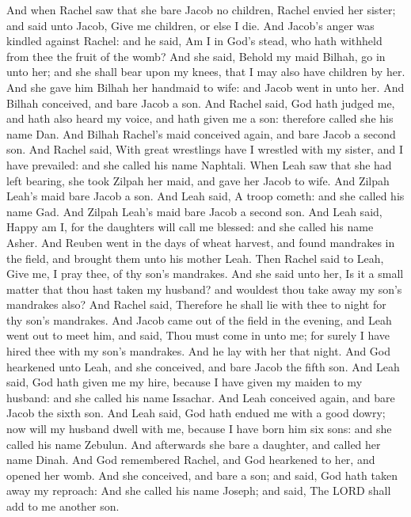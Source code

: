 \begin{biblechapter} %
\verse And when Rachel saw that she bare Jacob no children, Rachel envied her sister; and said unto Jacob, Give me children, or else I die.
\verse And Jacob's anger was kindled against Rachel: and he said, Am I in God's stead, who hath withheld from thee the fruit of the womb?
\verse And she said, Behold my maid Bilhah, go in unto her; and she shall bear upon my knees, that I may also have children by her.
\verse And she gave him Bilhah her handmaid to wife: and Jacob went in unto her.
\verse And Bilhah conceived, and bare Jacob a son.
\verse And Rachel said, God hath judged me, and hath also heard my voice, and hath given me a son: therefore called she his name Dan.
\verse And Bilhah Rachel's maid conceived again, and bare Jacob a second son.
\verse And Rachel said, With great wrestlings have I wrestled with my sister, and I have prevailed: and she called his name Naphtali.
\verse When Leah saw that she had left bearing, she took Zilpah her maid, and gave her Jacob to wife.
\verse And Zilpah Leah's maid bare Jacob a son.
\verse And Leah said, A troop cometh: and she called his name Gad.
\verse And Zilpah Leah's maid bare Jacob a second son.
\verse And Leah said, Happy am I, for the daughters will call me blessed: and she called his name Asher.
\verse And Reuben went in the days of wheat harvest, and found mandrakes in the field, and brought them unto his mother Leah. Then Rachel said to Leah, Give me, I pray thee, of thy son's mandrakes.
\verse And she said unto her, Is it a small matter that thou hast taken my husband? and wouldest thou take away my son's mandrakes also? And Rachel said, Therefore he shall lie with thee to night for thy son's mandrakes.
\verse And Jacob came out of the field in the evening, and Leah went out to meet him, and said, Thou must come in unto me; for surely I have hired thee with my son's mandrakes. And he lay with her that night.
\verse And God hearkened unto Leah, and she conceived, and bare Jacob the fifth son.
\verse And Leah said, God hath given me my hire, because I have given my maiden to my husband: and she called his name Issachar.
\verse And Leah conceived again, and bare Jacob the sixth son.
\verse And Leah said, God hath endued me with a good dowry; now will my husband dwell with me, because I have born him six sons: and she called his name Zebulun.
\verse And afterwards she bare a daughter, and called her name Dinah.
\verse And God remembered Rachel, and God hearkened to her, and opened her womb.
\verse And she conceived, and bare a son; and said, God hath taken away my reproach:
\verse And she called his name Joseph; and said, The LORD shall add to me another son.

\end{biblechapter}
